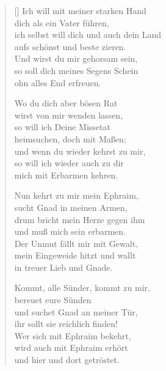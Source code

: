 \begin{multicols}{2}
\begin{verse}[\versewidth]
 Ich will mit meiner starken Hand\\
dich als ein Vater führen,\\
ich selbst will dich und auch dein Land\\
aufs schönst und beste zieren.\\
Und wirst du mir gehorsam sein,\\
so soll dich meines Segens Schein\\
ohn alles End erfreuen.

 Wo du dich aber bösen Rat\\
wirst von mir wenden lassen,\\
so will ich Deine Missetat\\
heimsuchen, doch mit Maßen;\\
und wenn du wieder kehrst zu mir,\\
so will ich wieder auch zu dir\\
mich mit Erbarmen kehren.

 Nun kehrt zu mir mein Ephraim,\\
sucht Gnad in meinen Armen,\\
drum bricht mein Herze gegen ihm\\
und muß mich sein erbarmen.\\
Der Unmut fällt mir mit Gewalt,\\
mein Eingeweide hitzt und wallt\\
in treuer Lieb und Gnade.

 Kommt, alle Sünder, kommt zu mir,\\
bereuet eure Sünden\\
und suchet Gnad an meiner Tür,\\
ihr sollt sie reichlich finden!\\
Wer sich mit Ephraim bekehrt,\\
wird auch mit Ephraim erhört\\
und hier und dort getröstet.
   
\end{verse}
\end{multicols}
